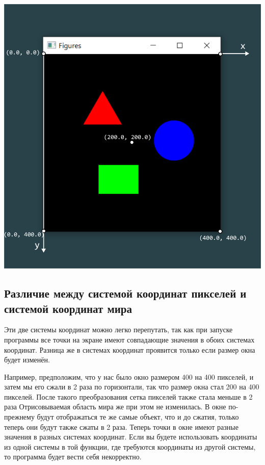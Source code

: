 \documentclass{article}
\begin{document}
\vspace{1cm}
\begin{center}
\includegraphics[scale=0.9]{../images/system_coords.png}
\end{center}





\newpage
\subsection*{Различие между системой координат пикселей и системой координат мира}
Эти две системы координат можно легко перепутать, так как при запуске программы все точки на экране имеют совпадающие значения в обоих системах координат. Разница же в системах координат проявится только если размер окна будет изменён. 

Например, предположим, что у нас было окно размером 400 на 400 пикселей, и затем мы его сжали в 2 раза по горизонтали, так что размер окна стал 200 на 400 пикселей. 
После такого преобразования сетка пикселей также стала меньше в 2 раза Отрисовываемая область мира же при этом не изменилась. В окне по-прежнему будут отображаться те же самые объект, что и до сжатия, только теперь они будут также сжаты в 2 раза.
Теперь точки в окне имеют разные значения в разных системах координат. Если вы будете использовать координаты из одной системы в той функции, где требуются координаты из другой системы, то программа будет вести себя некорректно.
\end{document}
